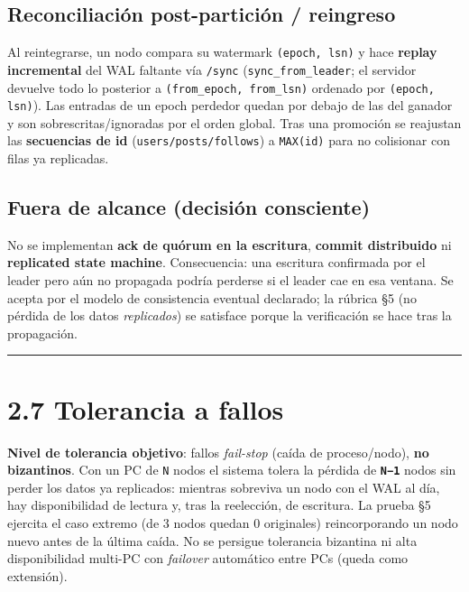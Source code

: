 \documentclass[11pt]{article}
\begin{document}
\subsection{Reconciliación post-partición / reingreso}

Al reintegrarse, un nodo compara su watermark \texttt{(epoch, lsn)} y hace \textbf{replay incremental} del WAL faltante vía \texttt{/\allowbreak{}sync} (\texttt{sync\_\allowbreak{}from\_\allowbreak{}leader}; el servidor devuelve todo lo posterior a \texttt{(from\_\allowbreak{}epoch, from\_\allowbreak{}lsn)} ordenado por \texttt{(epoch, lsn)}). Las entradas de un epoch perdedor quedan por debajo de las del ganador y son sobrescritas/ignoradas por el orden global. Tras una promoción se reajustan las \textbf{secuencias de id} (\texttt{users/\allowbreak{}posts/\allowbreak{}follows}) a \texttt{MAX(id)} para no colisionar con filas ya replicadas.

\subsection{Fuera de alcance (decisión consciente)}

No se implementan \textbf{ack de quórum en la escritura}, \textbf{commit distribuido} ni \textbf{replicated state machine}. Consecuencia: una escritura confirmada por el leader pero aún no propagada podría perderse si el leader cae en esa ventana. Se acepta por el modelo de consistencia eventual declarado; la rúbrica §5 (no pérdida de los datos \emph{replicados}) se satisface porque la verificación se hace tras la propagación.

\vspace{2pt}\noindent\rule{\textwidth}{0.4pt}\vspace{2pt}

\section{2.7 Tolerancia a fallos}

\textbf{Nivel de tolerancia objetivo}: fallos \emph{fail-stop} (caída de proceso/nodo), \textbf{no bizantinos}. Con un PC de \texttt{N} nodos el sistema tolera la pérdida de \textbf{\texttt{N−1}} nodos sin perder los datos ya replicados: mientras sobreviva un nodo con el WAL al día, hay disponibilidad de lectura y, tras la reelección, de escritura. La prueba §5 ejercita el caso extremo (de 3 nodos quedan 0 originales) reincorporando un nodo nuevo antes de la última caída. No se persigue tolerancia bizantina ni alta disponibilidad multi-PC con \emph{failover} automático entre PCs (queda como extensión).
\end{document}
